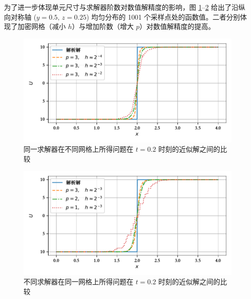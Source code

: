为了进一步体现单元尺寸与求解器阶数对数值解精度的影响，图 \ref{fig:linear_scalar_h_vary}–\ref{fig:linear_scalar_p_vary}
给出了沿纵向对称轴 ($y=0.5,\,z=0.25$) 均匀分布的 1001 个采样点处的函数值。二者分别体现了加密网格（减小
$h$）与增加阶数（增大 $p$）对数值解精度的提高。

\begin{figure}[h!]
\begin{centering}
\includegraphics[width=1\textwidth,height=0.3\textheight,keepaspectratio]{figures/linear_scalar/h_vary}
\par\end{centering}
\caption{\label{fig:linear_scalar_h_vary}同一求解器在不同网格上所得问题在
$t=0.2$ 时刻的近似解之间的比较}
\end{figure}

\begin{figure}[h!]
\begin{centering}
\includegraphics[width=1\textwidth,height=0.3\textheight,keepaspectratio]{figures/linear_scalar/p_vary}
\par\end{centering}
\caption{\label{fig:linear_scalar_p_vary}不同求解器在同一网格上所得问题在
$t=0.2$ 时刻的近似解之间的比较}
\end{figure}

